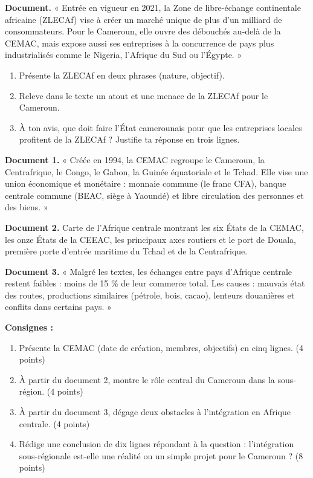 \documentclass[11pt]{article}
\newcounter{popsec}
\newcounter{popsub}
\newcommand{\courssub}[1]{%
  \stepcounter{popsub}%
  \par\vspace{9pt}\noindent{\popxbold\fontsize{11.5}{13}\selectfont\color{popink}{\color{poporange}\thepopsec.\thepopsub}\hspace{6pt}#1}\par\nopagebreak\vspace{4pt}
}
\begin{document}
\begin{exercice}
\textbf{Document.} « Entrée en vigueur en 2021, la Zone de libre-échange continentale africaine (ZLECAf) vise à créer un marché unique de plus d'un milliard de consommateurs. Pour le Cameroun, elle ouvre des débouchés au-delà de la CEMAC, mais expose aussi ses entreprises à la concurrence de pays plus industrialisés comme le Nigeria, l'Afrique du Sud ou l'Égypte. »
\begin{enumerate}
\item Présente la ZLECAf en deux phrases (nature, objectif).
\item Releve dans le texte un atout et une menace de la ZLECAf pour le Cameroun.
\item À ton avis, que doit faire l'État camerounais pour que les entreprises locales profitent de la ZLECAf ? Justifie ta réponse en trois lignes.
\end{enumerate}
\end{exercice}

\courssub{Je me prépare au Bac}

\begin{exercice}
\textbf{Document 1.} « Créée en 1994, la CEMAC regroupe le Cameroun, la Centrafrique, le Congo, le Gabon, la Guinée équatoriale et le Tchad. Elle vise une union économique et monétaire : monnaie commune (le franc CFA), banque centrale commune (BEAC, siège à Yaoundé) et libre circulation des personnes et des biens. »

\textbf{Document 2.} Carte de l'Afrique centrale montrant les six États de la CEMAC, les onze États de la CEEAC, les principaux axes routiers et le port de Douala, première porte d'entrée maritime du Tchad et de la Centrafrique.

\textbf{Document 3.} « Malgré les textes, les échanges entre pays d'Afrique centrale restent faibles : moins de 15 \% de leur commerce total. Les causes : mauvais état des routes, productions similaires (pétrole, bois, cacao), lenteurs douanières et conflits dans certains pays. »

\textbf{Consignes :}
\begin{enumerate}
\item Présente la CEMAC (date de création, membres, objectifs) en cinq lignes. (4 points)
\item À partir du document 2, montre le rôle central du Cameroun dans la sous-région. (4 points)
\item À partir du document 3, dégage deux obstacles à l'intégration en Afrique centrale. (4 points)
\item Rédige une conclusion de dix lignes répondant à la question : l'intégration sous-régionale est-elle une réalité ou un simple projet pour le Cameroun ? (8 points)
\end{enumerate}
\end{exercice}
\end{document}
